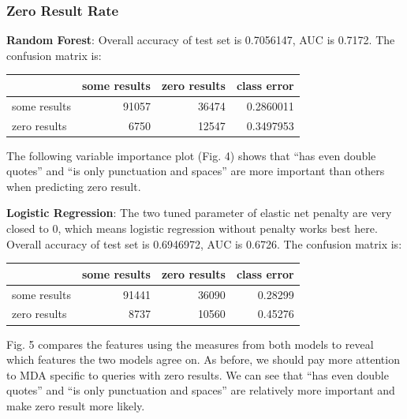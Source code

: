 \documentclass[12pt,]{article}
\begin{document}
\newpage

\subsubsection{Zero Result Rate}\label{zero-result-rate}

\textbf{Random Forest}: Overall accuracy of test set is 0.7056147, AUC
is 0.7172. The confusion matrix is:

\begin{longtable}[]{@{}lrrr@{}}
\toprule
& some results & zero results & class error\tabularnewline
\midrule
\endhead
some results & 91057 & 36474 & 0.2860011\tabularnewline
zero results & 6750 & 12547 & 0.3497953\tabularnewline
\bottomrule
\end{longtable}

The following variable importance plot (Fig. 4) shows that ``has even
double quotes'' and ``is only punctuation and spaces'' are more
important than others when predicting zero result.

\textbf{Logistic Regression}: The two tuned parameter of elastic net
penalty are very closed to 0, which means logistic regression without
penalty works best here. Overall accuracy of test set is 0.6946972, AUC
is 0.6726. The confusion matrix is:

\begin{longtable}[]{@{}lrrr@{}}
\toprule
& some results & zero results & class error\tabularnewline
\midrule
\endhead
some results & 91441 & 36090 & 0.28299\tabularnewline
zero results & 8737 & 10560 & 0.45276\tabularnewline
\bottomrule
\end{longtable}

Fig. 5 compares the features using the measures from both models to
reveal which features the two models agree on. As before, we should pay
more attention to MDA specific to queries with zero results. We can see
that ``has even double quotes'' and ``is only punctuation and spaces''
are relatively more important and make zero result more likely.

\newpage
\end{document}
